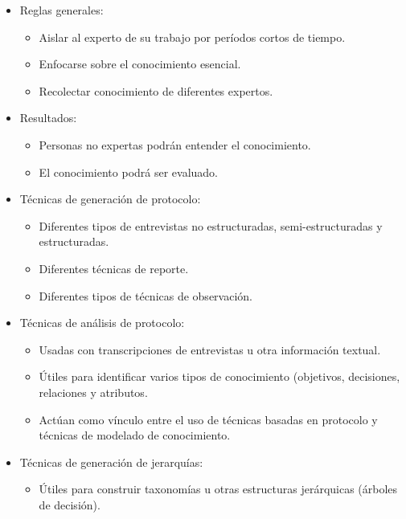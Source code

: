 \documentclass[a4paper,10pt,spanish,oneside]{article}
\begin{document}
\begin{itemize}
\item Reglas generales:

	\begin{itemize}
	\item Aislar al experto de su trabajo por períodos cortos de tiempo.
	\item Enfocarse sobre el conocimiento esencial.
	\item Recolectar conocimiento de diferentes expertos.
	\end{itemize}

\item Resultados:

	\begin{itemize}
	\item Personas no expertas podrán entender el conocimiento.
	\item El conocimiento podrá ser evaluado.
	\end{itemize}

\item Técnicas de generación de protocolo:

	\begin{itemize}
	\item Diferentes tipos de entrevistas no estructuradas, semi-estructuradas y 			estructuradas.
	\item Diferentes técnicas de reporte.
	\item Diferentes tipos de técnicas de observación.
	\end{itemize}

\item Técnicas de análisis de protocolo:

	\begin{itemize}
	\item Usadas con transcripciones de entrevistas u otra información textual.
	\item Útiles para identificar varios tipos de conocimiento (objetivos, 					decisiones, relaciones y atributos.
	\item Actúan como vínculo entre el uso de técnicas basadas en protocolo y técnicas 	de modelado de conocimiento.
	\end{itemize}
	

\item Técnicas de generación de jerarquías:

	\begin{itemize}
	\item Útiles para construir taxonomías u otras estructuras jerárquicas (árboles de 	decisión).
	\end{itemize}


\end{itemize}
\end{document}
